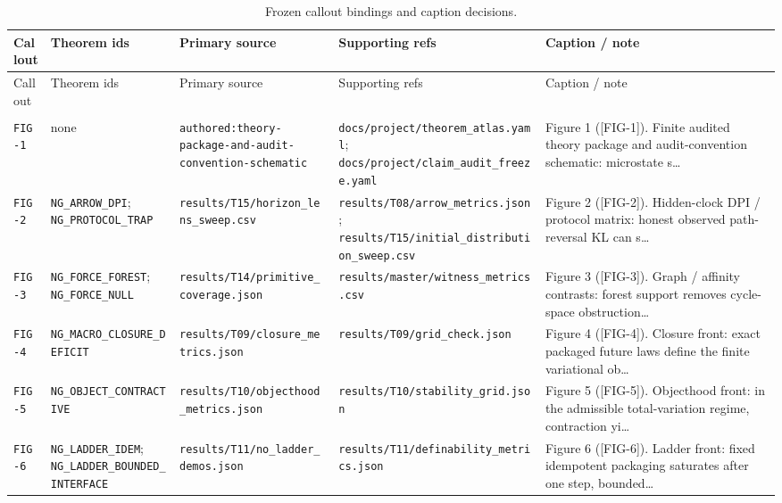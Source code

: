 {\scriptsize
\begin{longtable}{>{\raggedright\arraybackslash}p{} >{\raggedright\arraybackslash}p{} >{\raggedright\arraybackslash}p{} >{\raggedright\arraybackslash}p{} >{\raggedright\arraybackslash}p{}}
\caption{Frozen callout bindings and caption decisions.}\label{tab:callout-map}\\
\toprule
Callout & Theorem ids & Primary source & Supporting refs & Caption / note\\
\midrule
\endfirsthead
\toprule
Callout & Theorem ids & Primary source & Supporting refs & Caption / note\\
\midrule
\endhead
\midrule
\multicolumn{5}{r}{Continued on next page}\\
\midrule
\endfoot
\bottomrule
\endlastfoot
\texttt{FIG-1} & none & \texttt{authored:theory-package-and-audit-convention-schematic} & \texttt{docs/project/theorem\_atlas.yaml}; \texttt{docs/project/claim\_audit\_freeze.yaml} & Figure 1 ([FIG-1]). Finite audited theory package and audit-convention schematic: microstate s…\\
\texttt{FIG-2} & \texttt{NG\_ARROW\_DPI}; \texttt{NG\_PROTOCOL\_TRAP} & \texttt{results/T15/horizon\_lens\_sweep.csv} & \texttt{results/T08/arrow\_metrics.json}; \texttt{results/T15/initial\_distribution\_sweep.csv} & Figure 2 ([FIG-2]). Hidden-clock DPI / protocol matrix: honest observed path-reversal KL can s…\\
\texttt{FIG-3} & \texttt{NG\_FORCE\_FOREST}; \texttt{NG\_FORCE\_NULL} & \texttt{results/T14/primitive\_coverage.json} & \texttt{results/master/witness\_metrics.csv} & Figure 3 ([FIG-3]). Graph / affinity contrasts: forest support removes cycle-space obstruction…\\
\texttt{FIG-4} & \texttt{NG\_MACRO\_CLOSURE\_DEFICIT} & \texttt{results/T09/closure\_metrics.json} & \texttt{results/T09/grid\_check.json} & Figure 4 ([FIG-4]). Closure front: exact packaged future laws define the finite variational ob…\\
\texttt{FIG-5} & \texttt{NG\_OBJECT\_CONTRACTIVE} & \texttt{results/T10/objecthood\_metrics.json} & \texttt{results/T10/stability\_grid.json} & Figure 5 ([FIG-5]). Objecthood front: in the admissible total-variation regime, contraction yi…\\
\texttt{FIG-6} & \texttt{NG\_LADDER\_IDEM}; \texttt{NG\_LADDER\_BOUNDED\_INTERFACE} & \texttt{results/T11/no\_ladder\_demos.json} & \texttt{results/T11/definability\_metrics.json} & Figure 6 ([FIG-6]). Ladder front: fixed idempotent packaging saturates after one step, bounded…\\

\end{longtable}}
